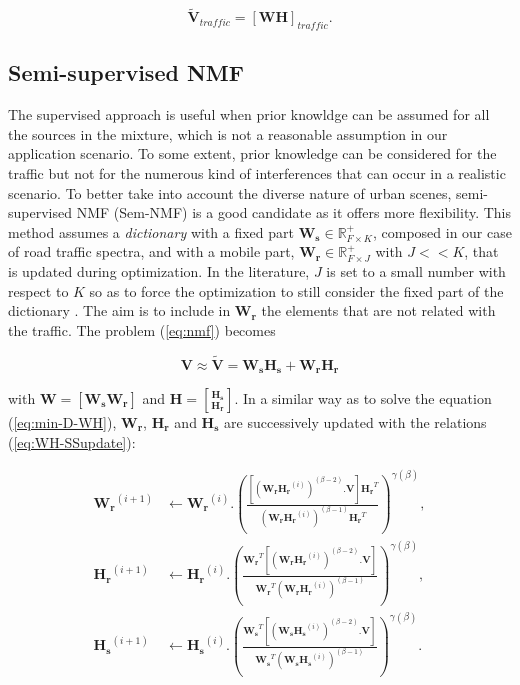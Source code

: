 \documentclass[twocolumn]{svjour3}          %
\begin{document}
\begin{equation}\label{eq:separationExtraction}
\mathbf{\tilde{V}}_{traffic} = \left[ \mathbf{WH} \right]_{traffic}.
\end{equation}

\subsection{Semi-supervised NMF}

The supervised approach is useful when prior knowldge can be assumed for all the sources in the mixture, which is not a reasonable assumption in our application scenario. To some extent, prior knowledge can be considered for the traffic but not for the numerous kind of interferences that can occur in a realistic scenario. To better take into account the diverse nature of urban scenes, semi-supervised NMF (Sem-NMF)\cite{lee_semi-supervised_2010} is a good candidate as it offers more flexibility. This method assumes a \textit{dictionary} with a fixed part $\mathbf{W_s} \in \mathbb{R}^+_{F\times K}$, composed in our case of road traffic spectra, and with a mobile part, $\mathbf{W_r} \in \mathbb{R}^+_{F\times J}$ with $J <<K$, that is updated during optimization. In the literature, $J$ is set to a small number with respect to $K$ so as to force the optimization to still consider the fixed part of the dictionary \cite{lefevre2012semi}. The aim is to include in $\mathbf{W_r}$ the elements that are not related with the traffic. The problem (\ref{eq:nmf}) becomes

\begin{equation}
\mathbf{V} \approx \mathbf{\tilde{V}} = \mathbf{W_s H_s}+ \mathbf{W_r H_r}
\end{equation}

 with $\mathbf{W} = \left[\mathbf{W_s} \mathbf{W_r} \right]$ and $\mathbf{H} = \genfrac[]{0pt}{0}{\mathbf{H_s}}{\mathbf{H_r}}$. In a similar way as to solve the equation (\ref{eq:min-D-WH}), $\mathbf{W_r}$, $\mathbf{H_r}$ and $\mathbf{H_s}$ are successively updated with the relations (\ref{eq:WH-SSupdate}):

{\scriptsize
\begin{subequations}\label{eq:WH-SSupdate}
\begin{align}
\mathbf{W_r}^{(i+1)} &\leftarrow \mathbf{W_r}^{(i)}.\left(\frac{\left[\left(\mathbf{W_r H_r}^{(i)} \right)^{(\beta-2)}.\mathbf{V} \right]\mathbf{H_r}^T}{\left(\mathbf{W_r H_r}^{(i)} \right)^{(\beta-1)}\mathbf{H_r}^T}\right)^{\gamma(\beta)}, \label{eq:W_r_SS}\\
\mathbf{H_r}^{(i+1)} &\leftarrow \mathbf{H_r}^{(i)}.\left(\frac{\mathbf{W_r}^T \left[\left(\mathbf{W_r H_r}^{(i)} \right)^{(\beta-2)}.\mathbf{V} \right]}{\mathbf{W_r}^T \left(\mathbf{W_r H_r}^{(i)} \right)^{(\beta-1)}}\right)^{\gamma(\beta)}, \label{eq:H_r_SS}\\
\mathbf{H_s}^{(i+1)} &\leftarrow \mathbf{H_s}^{(i)}.\left(\frac{\mathbf{W_s}^T \left[\left(\mathbf{W_s H_s}^{(i)} \right)^{(\beta-2)}.\mathbf{V} \right]}{\mathbf{W_s}^T \left(\mathbf{W_s H_s}^{(i)} \right)^{(\beta-1)}}\right)^{\gamma(\beta)}.\label{eq:H_s_SS}
\end{align}
\end{subequations}}
\end{document}
